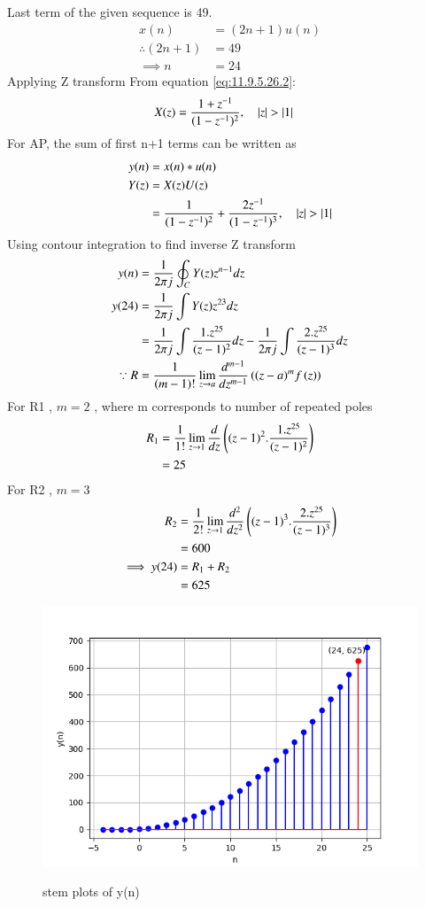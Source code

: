 \documentclass[journal,12pt,twocolumn]{IEEEtran}
\theoremstyle{remark}
\begin{document}
Last term of the given sequence is 49.
\begin{align}
 x(n) &= (2n+1)u(n) \\
 \therefore ( 2n +1 ) &= 49 \\
\implies n &= 24 
\end{align}
Applying Z transform
From equation \eqref{eq:11.9.5.26.2}:
\begin{align}
   X(z) &= \frac{1+z^{-1}}{(1-z^{-1})^2},  \quad \left\vert z\right\vert > \left\vert1\right\vert  
\end{align}
For AP, the sum of first n+1 terms can be written as 
\begin{align}
y(n)&=x(n)*u(n) \\
Y(z) &= X(z)U(z)\\
 &=\frac{1}{(1-z^{-1})^2} + \frac{2z^{-1}}{(1-z^{-1})^3}, \quad \left\vert z\right\vert > \left\vert1\right\vert 
\end{align}
Using contour integration to find inverse Z transform
\begin{align}
y(n) &= \frac{1}{2\pi j} \oint_C Y(z) z^{n-1} dz\\
y(24) &= \frac{1}{2\pi j}\int Y(z) z^{23} dz \\
 &= \frac{1}{2\pi j}\int \frac{1.z^{25}}{(z-1)^{2}} dz - \frac{1}{2\pi j}\int \frac{2.z^{25}}{(z-1)^{3}} dz\\
 \because R&=\frac{1}{\left(m-1\right)!}\lim\limits_{z\to a}\frac{d^{m-1}}{dz^{m-1}}\left({(z-a)}^{m}f\left(z\right)\right)
 \end{align}
 For R1 , $m = 2$ , where m corresponds to number of repeated poles \\
 \begin{align}
 R_1 &=\frac{1}{1!}\lim\limits_{z\to 1}\frac{d}{dz}\left((z-1)^2.\frac{1.z^{25}}{(z-1)^{2}}\right)\\
 &= 25
 \end{align}
 For R2 , $m = 3$ \\
 \begin{align}
 R_2 &=\frac{1}{2!}\lim\limits_{z\to 1}\frac{d^2}{dz^2}\left((z-1)^3.\frac{2.z^{25}}{(z-1)^{3}}\right)\\
 &= 600\\
 \implies y(24) &= R_1 + R_2 \\
&= 625
\end{align}
\begin{figure}[h!]
\centering
\includegraphics[width=\columnwidth]{figs/stem_plot.png}
\label{fig:plot}
\caption{stem plots of y(n)}
\end{figure}
\end{document}
